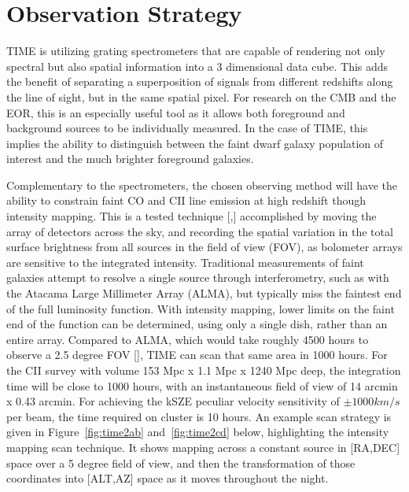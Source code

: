 \documentclass[manuscript]{aastex}
\begin{document}
\newpage
\section{\textbf{Observation Strategy}}

TIME is utilizing grating spectrometers that are capable of rendering not only spectral but also spatial information into a 3 dimensional data cube. This adds the benefit of separating a superposition of signals from different redshifts along the line of sight, but in the same spatial pixel. For research on the CMB and the EOR, this is an especially useful tool as it allows both foreground and background sources to be individually measured. In the case of TIME, this implies the ability to distinguish between the faint dwarf galaxy population of interest and the much brighter foreground galaxies. 

Complementary to the spectrometers, the chosen observing method will have the ability to constrain faint CO and CII line emission at high redshift though intensity mapping. This is a tested technique [\cite{Keating2015},\cite{Keating2016}] accomplished by moving the array of detectors across the sky, and recording the spatial variation in the total surface brightness from all sources in the field of view (FOV), as bolometer arrays are sensitive to the integrated intensity. Traditional measurements of faint galaxies attempt to resolve a single source through interferometry, such as with the Atacama Large Millimeter Array (ALMA), but typically miss the faintest end of the full luminosity function. With intensity mapping, lower limits on the faint end of the function can be determined, using only a single dish, rather than an entire array. Compared to ALMA, which would take roughly 4500 hours to observe a 2.5 degree FOV [\cite{Kovetz2017}], TIME can scan that same area in 1000 hours. For the CII survey with volume 153 Mpc x 1.1 Mpc x 1240 Mpc deep, the integration time will be close to 1000 hours, with an instantaneous field of view of 14 arcmin x 0.43 arcmin. For achieving the kSZE peculiar velocity sensitivity of $\pm 1000 km/s$ per beam, the time required on cluster is 10 hours. An example scan strategy is given in Figure~\ref{fig:time2ab} and~\ref{fig:time2cd} below, highlighting the intensity mapping scan technique. It shows mapping across a constant source in [RA,DEC] space over a 5 degree field of view, and then the transformation of those coordinates into [ALT,AZ] space as it moves throughout the night.
\end{document}
